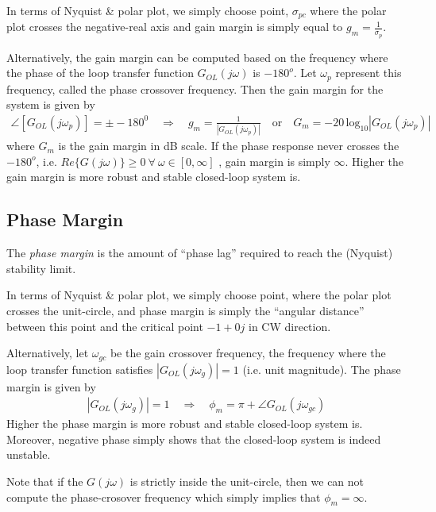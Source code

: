 \documentclass[twoside]{article}
\begin{document}
In terms of Nyquist \& polar plot, we simply choose point,
$\sigma_{pc}$ where the polar plot crosses the negative-real axis
and gain margin is simply equal to  $g_m = \frac{1}{\sigma_{p}}$. 

Alternatively, the gain margin can be computed based on 
the frequency where the phase of the loop transfer function
$G_{OL}(j \omega)$ is $-180^o$. Let $\omega_{p}$ represent this frequency,
called the phase crossover frequency. Then the gain margin for the
system is given by
%
\begin{align*}
  \angle [ G_{OL}(j \omega_{p}) ] = \pm -180^0
  \quad \Rightarrow \quad 
  g_m = \frac{1}{| G_{OL}(j \omega_{p})| } \quad \mathrm{or} \quad G_m
  = -20 \,
  \mathrm{log}_{10} | G_{OL}(j \omega_{p} ) |
\end{align*}
%
where $G_m$ is the gain margin in dB scale. If the phase response never crosses the $-180^o$,  
i.e. $Re \lbrace G(j \omega) \rbrace \geq 0 \ \forall \ \omega \in [0,\infty]$
, gain margin is simply $\infty$.
Higher the gain margin is more robust and stable closed-loop
system is. 

\subsection*{Phase Margin}

The \textit{phase margin} is the amount of ``phase lag'' required to
reach the (Nyquist) stability limit. 

In terms of Nyquist \& polar plot, we simply choose point,
where the polar plot crosses the unit-circle, and phase margin 
is simply the ``angular distance'' between this point and the
critical point $-1 + 0 j$ in CW direction. 

Alternatively, let $\omega_{gc}$ be the gain crossover frequency,
 the frequency where the loop transfer function satisfies $| G_{OL}(j \omega_g)
 | = 1$ (i.e. unit magnitude). The phase margin 
is given by
%
\begin{align*}
  | G_{OL}(j \omega_g) | = 1 \quad \Rightarrow \quad
  \phi_m = \pi + \angle G_{OL} (j \omega_{gc})
\end{align*}
% 
Higher the phase margin is more robust and stable closed-loop
system is. Moreover, negative phase simply shows that the closed-loop 
system is indeed unstable. 

Note that if the $G(j \omega)$ is strictly inside the unit-circle,
then we can not compute the phase-crosover frequency which 
simply implies that $\phi_m = \infty$. 
\end{document}
